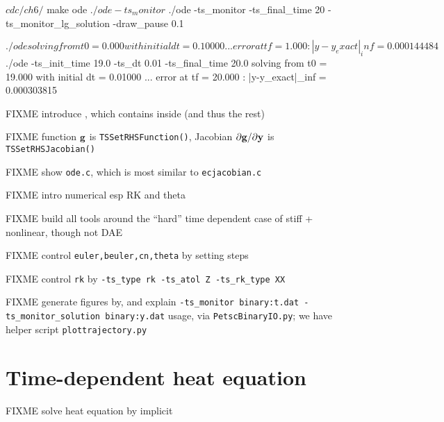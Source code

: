 \begin{cline}
$ cd c/ch6/
$ make ode
$ ./ode -ts_monitor
$ ./ode -ts_monitor -ts_final_time 20 -ts_monitor_lg_solution -draw_pause 0.1
\end{cline}

\begin{cline}
$ ./ode 
solving from t0 = 0.000 with initial dt = 0.10000 ...
error at tf = 1.000 :  |y-y_exact|_inf = 0.000144484
$ ./ode -ts_init_time 19.0 -ts_dt 0.01 -ts_final_time 20.0
solving from t0 = 19.000 with initial dt = 0.01000 ...
error at tf = 20.000 :  |y-y_exact|_inf = 0.000303815
\end{cline}

FIXME introduce \pTS, which contains \pSNES inside (and thus the rest)

FIXME function $\mathbf{g}$ is \texttt{TSSetRHSFunction()}, Jacobian $\partial \mathbf{g}/\partial \mathbf{y}$ is \texttt{TSSetRHSJacobian()}

FIXME show \texttt{ode.c}, which is most similar to \texttt{ecjacobian.c}

FIXME intro numerical esp RK and theta \citep{AscherPetzold1998}

FIXME build all tools around the ``hard'' time dependent case of stiff + nonlinear, though not DAE

FIXME control \texttt{euler,beuler,cn,theta} by setting steps

FIXME control \texttt{rk} by \texttt{-ts\_type rk -ts\_atol Z -ts\_rk\_type XX}

FIXME generate figures by, and explain \texttt{-ts\_monitor binary:t.dat -ts\_monitor\_solution binary:y.dat} usage, via \texttt{PetscBinaryIO.py}; we have helper script \texttt{plottrajectory.py}


\section{Time-dependent heat equation}

FIXME solve heat equation by implicit





